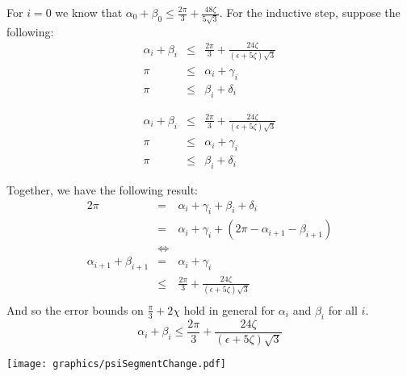 \documentclass[10pt]{CSUNthesis}
\theoremstyle{plain}%
\theoremstyle{definition}
\theoremstyle{remark}
\newcommand{\lr}[1]{\left( #1 \right)}
\begin{document}
For $i=0$ we know that $\alpha_0 + \beta_0 \leq \frac{2\pi}{3} + \frac{48 \zeta}{5\sqrt{3}}.$
For the inductive step, suppose the following:
$$
\begin{array}{rcl}
\alpha_i +\beta_i &\leq& \frac{2 \pi}{3} + \frac{24 \zeta}{\lr{\epsilon + 5 \zeta}\sqrt{3}}\\
\pi &\leq& \alpha_i + \gamma_i \\
\pi &\leq& \beta_i + \delta_i
\end{array}
$$ 

$$
\begin{array}{rcl}
\alpha_i +\beta_i &\leq& \frac{2 \pi}{3} + \frac{24 \zeta}{\lr{\epsilon + 5 \zeta}\sqrt{3}}\\
\pi &\leq& \alpha_i + \gamma_i \\
\pi &\leq& \beta_i + \delta_i
\end{array}
$$

Together, we have the following result:
\begin{eqnarray*}
2\pi &=& \alpha_i + \gamma_i + \beta_i + \delta_i\\
 &=& \alpha_i + \gamma_i + \lr{2\pi - \alpha_{i+1} - \beta_{i+1}}\\
 &\iff&\\
\alpha_{i+1} + \beta_{i+1}&=&\alpha_i + \gamma_i \\
&\leq& \frac{2\pi}{3} + \frac{24 \zeta}{\lr{\epsilon + 5 \zeta}\sqrt{3}}\\
\end{eqnarray*}
And so the error bounds on $\frac{\pi}{3}+2\chi$ hold in general for $\alpha_i$ and $\beta_i$ for all $i$.  
$$\alpha_i + \beta_i \leq \frac{2\pi}{3} + \frac{24 \zeta}{\lr{\epsilon + 5 \zeta}\sqrt{3}}$$

\begin{minipage}{\linewidth}
\begin{center}
\texttt{[image: graphics/psiSegmentChange.pdf]}
\label{fig:psiSegmentChange.pdf}
\end{center}
\end{minipage}
\end{document}

